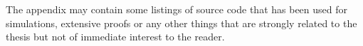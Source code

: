 \chapter{}
The appendix may contain some listings of source code that has been used for simulations, extensive proofs or any other things that are strongly related to the thesis but not of immediate interest to the reader. 